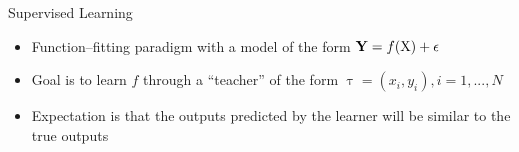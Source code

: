 \begin{frame}{Supervised Learning}
    \begin{itemize}
        \item Function--fitting paradigm with a model of the form $\boldsymbol{\mathbf{Y}} = f(\text{X}) + \epsilon$
        \item Goal is to learn $f$ through a ``teacher'' of the form $\uptau = (x_i, y_i), i = 1,..., N$ \cite{book:esl}
        \item Expectation is that the outputs predicted by the learner will be similar to the true outputs
    \end{itemize}
\end{frame}